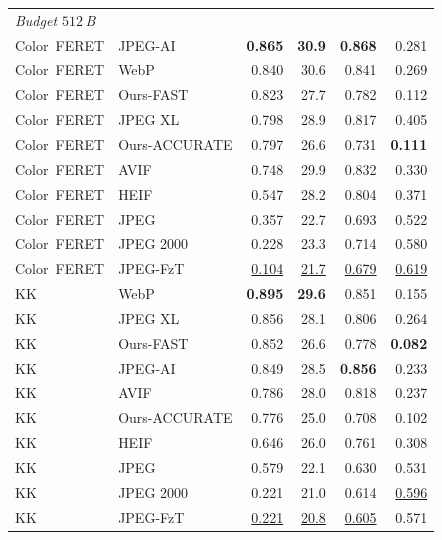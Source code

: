 \begin{tabular}{llrrrr}
\midrule
\multicolumn{6}{l}{\emph{Budget $512$\,B}}\\
Color~FERET & JPEG-AI & \cellcolor{green!25}\textbf{0.865} & \cellcolor{green!25}\textbf{30.9} & \cellcolor{green!25}\textbf{0.868} & 0.281 \\
Color~FERET & WebP & 0.840 & 30.6 & 0.841 & 0.269 \\
Color~FERET & Ours-FAST & 0.823 & 27.7 & 0.782 & 0.112 \\
Color~FERET & JPEG XL & 0.798 & 28.9 & 0.817 & 0.405 \\
Color~FERET & Ours-ACCURATE & 0.797 & 26.6 & 0.731 & \cellcolor{green!25}\textbf{0.111} \\
Color~FERET & AVIF & 0.748 & 29.9 & 0.832 & 0.330 \\
Color~FERET & HEIF & 0.547 & 28.2 & 0.804 & 0.371 \\
Color~FERET & JPEG & 0.357 & 22.7 & 0.693 & 0.522 \\
Color~FERET & JPEG 2000 & 0.228 & 23.3 & 0.714 & 0.580 \\
Color~FERET & JPEG-FzT & \cellcolor{red!22}\underline{0.104} & \cellcolor{red!22}\underline{21.7} & \cellcolor{red!22}\underline{0.679} & \cellcolor{red!22}\underline{0.619} \\
KK & WebP & \cellcolor{green!25}\textbf{0.895} & \cellcolor{green!25}\textbf{29.6} & 0.851 & 0.155 \\
KK & JPEG XL & 0.856 & 28.1 & 0.806 & 0.264 \\
KK & Ours-FAST & 0.852 & 26.6 & 0.778 & \cellcolor{green!25}\textbf{0.082} \\
KK & JPEG-AI & 0.849 & 28.5 & \cellcolor{green!25}\textbf{0.856} & 0.233 \\
KK & AVIF & 0.786 & 28.0 & 0.818 & 0.237 \\
KK & Ours-ACCURATE & 0.776 & 25.0 & 0.708 & 0.102 \\
KK & HEIF & 0.646 & 26.0 & 0.761 & 0.308 \\
KK & JPEG & 0.579 & 22.1 & 0.630 & 0.531 \\
KK & JPEG 2000 & 0.221 & 21.0 & 0.614 & \cellcolor{red!22}\underline{0.596} \\
KK & JPEG-FzT & \cellcolor{red!22}\underline{0.221} & \cellcolor{red!22}\underline{20.8} & \cellcolor{red!22}\underline{0.605} & 0.571 \\
\bottomrule
\end{tabular}
